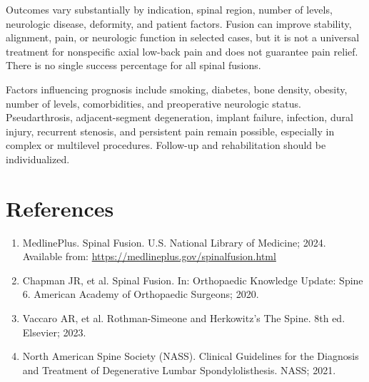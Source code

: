 Outcomes vary substantially by indication, spinal region, number of levels, neurologic disease, deformity, and patient factors. Fusion can improve stability, alignment, pain, or neurologic function in selected cases, but it is not a universal treatment for nonspecific axial low-back pain and does not guarantee pain relief. There is no single success percentage for all spinal fusions.

Factors influencing prognosis include smoking, diabetes, bone density, obesity, number of levels, comorbidities, and preoperative neurologic status. Pseudarthrosis, adjacent-segment degeneration, implant failure, infection, dural injury, recurrent stenosis, and persistent pain remain possible, especially in complex or multilevel procedures. Follow-up and rehabilitation should be individualized.

\section*{References}
\begin{enumerate}
  \item MedlinePlus. Spinal Fusion. U.S. National Library of Medicine; 2024. Available from: \url{https://medlineplus.gov/spinalfusion.html}
  \item Chapman JR, et al. Spinal Fusion. In: Orthopaedic Knowledge Update: Spine 6. American Academy of Orthopaedic Surgeons; 2020.
  \item Vaccaro AR, et al. Rothman-Simeone and Herkowitz's The Spine. 8th ed. Elsevier; 2023.
  \item North American Spine Society (NASS). Clinical Guidelines for the Diagnosis and Treatment of Degenerative Lumbar Spondylolisthesis. NASS; 2021.
\end{enumerate}

\clearpage

